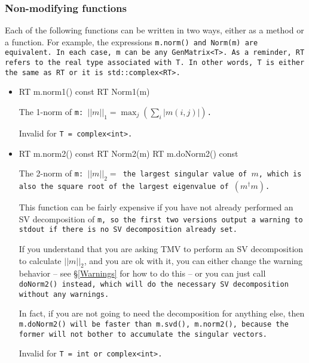 \subsubsection{Non-modifying functions}

Each of the following functions can be written in two ways,
either as a method or a function.
For example, the expressions \tt{m.norm()} and \tt{Norm(m)}
are equivalent.  
In each case, \tt{m} can be any \tt{GenMatrix<T>}.
As a reminder, \tt{RT} refers to the real type associated with \tt{T}.
In other words, \tt{T} is either the same as \tt{RT} or it is
\tt{std::complex<RT>}.

\begin{itemize}

\item
\begin{tmvcode}
RT m.norm1() const
RT Norm1(m)
\end{tmvcode}
The 1-norm of \tt{m}: 
$||m||_1 = \max_j (\sum_i |m(i,j)|)$.  

Invalid for \tt{T = complex<int>}.

\item
\begin{tmvcode}
RT m.norm2() const
RT Norm2(m)
RT m.doNorm2() const
\end{tmvcode}
The 2-norm of \tt{m}: $||m||_2 =$ the largest singular value of $m$, which
is also the square root of the largest eigenvalue of $(m^\dagger m)$.  

This function can be fairly expensive if you have not
already performed an SV decomposition of \tt{m}, so the first two versions
output a warning to \tt{stdout} if there is no SV decomposition already set.

If you understand that you are asking TMV to perform an SV decomposition
to calculate $||m||_2$, and you are ok with it, you can either change the warning
behavior -- see \S\ref{Warnings} for how to do this --
or you can just call \tt{doNorm2()} instead, which will do the 
necessary SV decomposition without any warnings.

In fact, if you are not going to need the decomposition for anything else,
then \tt{m.doNorm2()} will be faster than \tt{m.svd(), m.norm2()}, because the 
former will not bother to accumulate the singular vectors.

Invalid for \tt{T = int} or \tt{complex<int>}.


\end{itemize}
